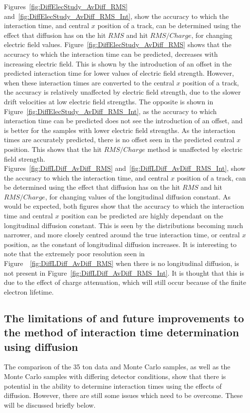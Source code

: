 Figures~\ref{fig:DiffElecStudy_AvDiff_RMS} and~\ref{fig:DiffElecStudy_AvDiff_RMS_Int}, show the accuracy to which the interaction time, and central $x$ position of a track, can be determined using the effect that diffusion has on the hit $RMS$ and hit $RMS/Charge$, for changing electric field values. Figure~\ref{fig:DiffElecStudy_AvDiff_RMS} shows that the accuracy to which the interaction time can be predicted, decreases with increasing electric field. This is shown by the introduction of an offset in the predicted interaction time for lower values of electric field strength. However, when these interaction times are converted to the central $x$ position of a track, the accuracy is relatively unaffected by electric field strength, due to the slower drift velocities at low electric field strengths. The opposite is shown in Figure~\ref{fig:DiffElecStudy_AvDiff_RMS_Int}, as the accuracy to which interaction time can be predicted does not see the introduction of an offset, and is better for the samples with lower electric field strengths. As the interaction times are accurately predicted, there is no offset seen in the predicted central $x$ position. This shows that the hit $RMS/Charge$ method is unaffected by electric field strength. \\

Figures~\ref{fig:DiffLDiff_AvDiff_RMS} and~\ref{fig:DiffLDiff_AvDiff_RMS_Int}, show the accuracy to which the interaction time, and central $x$ position of a track, can be determined using the effect that diffusion has on the hit $RMS$ and hit $RMS/Charge$, for changing values of the longitudinal diffusion constant. As would be expected, both figures show that the accuracy to which the interaction time and central $x$ position can be predicted are highly dependant on the longitudinal diffusion constant. This is seen by the distributions becoming much narrower, and more closely centred around the true interaction time, or central $x$ position, as the constant of longitudinal diffusion increases. It is interesting to note that the extremely poor resolution seen in Figure~~\ref{fig:DiffLDiff_AvDiff_RMS} when there is no longitudinal diffusion, is not present in Figure~\ref{fig:DiffLDiff_AvDiff_RMS_Int}. It is thought that this is due to the effect of charge attenuation, which will still occur because of the finite electron lifetime. 

\subsection{The limitations of and future improvements to the method of interaction time determination using diffusion} \label{sec:DiffLimitations}
The comparison of the 35 ton data and Monte Carlo samples, as well as the Monte Carlo samples with differing detector conditions, show that there is potential in the ability to determine interaction times using the effects of diffusion. However, there are still some issues which need to be overcome. These will be discussed briefly below. \\

